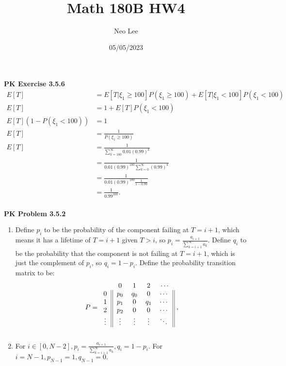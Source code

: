 \documentclass{article}
\title{Math 180B HW4}
\author{Neo Lee}
\date{05/05/2023}
\begin{document}
 

\maketitle 

\textbf{PK Exercise 3.5.6}
\begin{align*}
    E[T] & = E[T|\xi_1 \ge 100]P(\xi_1 \ge 100) + E[T|\xi_1 < 100]P(\xi_1 < 100) \\
    E[T] & = 1 + E[T]P(\xi_1 < 100) \\
    E[T](1-P(\xi_1 < 100)) & = 1 \\
    E[T] & = \frac{1}{P(\xi_1 \ge 100)} \\
    E[T] & = \frac{1}{\sum_{k=100}^{\infty}0.01(0.99)^k} \\
    & = \frac{1}{0.01(0.99)^{100}\sum_{k=0}^{\infty}(0.99)^k} \\
    & = \frac{1}{0.01(0.99)^{100}\frac{1}{1-0.99}} \\
    & = \frac{1}{0.99^{100}}. \\
\end{align*}
\bigbreak

\textbf{PK Problem 3.5.2}
\begin{enumerate}[label=(\alph*)]
    \item Define $p_i$ to be the probability of the component failing at $T=i+1$, which means it has a lifetime of $T=i+1$ given $T > i$, so $p_i = \frac{a_{i+1}}{\sum\limits_{k=i+1}^{\infty}a_k}$. 
    Define $q_i$ to be the probability that the component is not failing at $T=i+1$, which is just the complement of $p_i$, so $q_i = 1-p_i$.
    Define the probability transition matrix to be:
    \begin{align*}
        P & = 
        \begin{blockarray}{ccccc}
            & 0 & 1 & 2 & \cdots  \\
            \begin{block}{c||cccc||}
                0 & p_0 & q_0 & 0 & \cdots \\
                1 & p_1 & 0 & q_1 & \cdots \\
                2 & p_2 & 0 & 0 & \cdots \\
                \vdots & \vdots & \vdots & \vdots & \ddots \\
            \end{block}
        \end{blockarray}\; , \nonumber \\
    \end{align*}

    \item
    For $i\in[0, N-2], p_i = \frac{a_{i+1}}{\sum\limits_{k=i+1}^{\infty}a_k}, q_i = 1-p_i$. For $i = N-1, p_{N-1} = 1, q_{N-1} = 0.$
\end{enumerate}
\bigbreak
\end{document}
